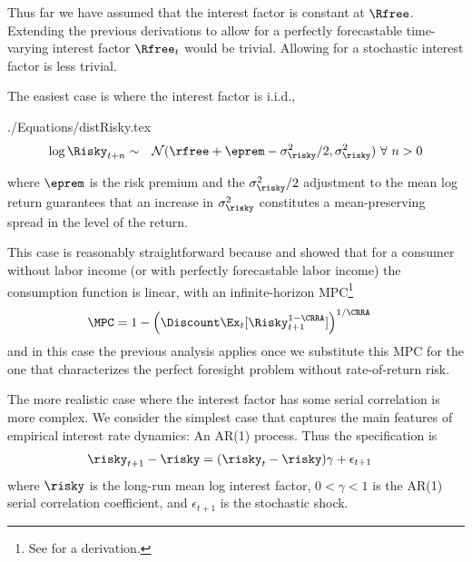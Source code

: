 \documentclass[titlepage]{\econtex}
\begin{document}
Thus far we have assumed that the interest factor is constant at $\Rfree$.  Extending the
previous derivations to allow for a perfectly forecastable time-varying interest factor $\Rfree_{t}$ 
would be trivial.  Allowing for a stochastic interest factor is less trivial.  


The easiest case is where the interest factor is i.i.d.,
\begin{verbatimwrite}{./Equations/distRisky.tex}
  \begin{equation}\begin{gathered}\begin{aligned}
    \log \Risky_{t+n} & \sim & \mathcal{N}(\rfree + \eprem - \sigma^{2}_{\risky}/2,\sigma^{2}_{\risky}) ~\forall~n>0 \label{eq:distRisky}
  \end{aligned}\end{gathered}\end{equation}
\end{verbatimwrite}


where $\eprem$ is the risk premium and the $\sigma^{2}_{\risky}/2$ adjustment to the mean log return
guarantees that an increase in $\sigma^{2}_{\risky}$ constitutes a mean-preserving spread in the level of the return.  

This case is reasonably straightforward because \cite{merton:restat} and \cite{samuelson:portfolio} showed
that for a consumer without labor income (or with perfectly forecastable labor income) the consumption
function is linear, with an infinite-horizon MPC\footnote{See  for a derivation.}
\begin{equation}\begin{gathered}\begin{aligned}
  \MPC  & = 1- \left(\Discount  \Ex_{t}[\Risky_{t+1}^{1-\CRRA}]\right)^{1/\CRRA} \label{eq:MPCExact}
\end{aligned}\end{gathered}\end{equation}
and in this case the previous analysis applies once we substitute this MPC for the one that characterizes 
the perfect foresight problem without rate-of-return risk.  

The more realistic case where the interest factor has some serial correlation is more complex.  We consider 
the simplest case that captures the main features of empirical interest rate dynamics: An AR(1) process.  Thus
the specification is 
\begin{equation}\begin{gathered}\begin{aligned}
  \risky_{t+1}-\risky  & = (\risky_{t}-\risky) \gamma + \epsilon_{t+1} 
\end{aligned}\end{gathered}\end{equation}
where $\risky$ is the long-run mean log interest factor, $0 < \gamma < 1$ is the AR(1) serial correlation
coefficient, and $\epsilon_{t+1}$ is the stochastic shock.  
\end{document}
